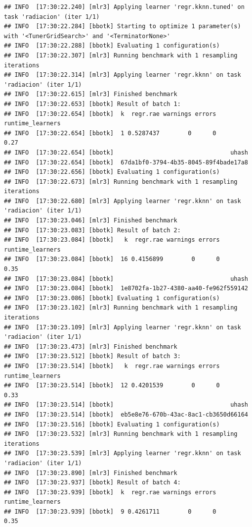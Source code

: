 \documentclass[
  11pt,
  a4paper,
]{article}
\begin{document}
\begin{verbatim}
## INFO  [17:30:22.240] [mlr3] Applying learner 'regr.kknn.tuned' on task 'radiacion' (iter 1/1)
## INFO  [17:30:22.284] [bbotk] Starting to optimize 1 parameter(s) with '<TunerGridSearch>' and '<TerminatorNone>'
## INFO  [17:30:22.288] [bbotk] Evaluating 1 configuration(s)
## INFO  [17:30:22.307] [mlr3] Running benchmark with 1 resampling iterations
## INFO  [17:30:22.314] [mlr3] Applying learner 'regr.kknn' on task 'radiacion' (iter 1/1)
## INFO  [17:30:22.615] [mlr3] Finished benchmark
## INFO  [17:30:22.653] [bbotk] Result of batch 1:
## INFO  [17:30:22.654] [bbotk]  k  regr.rae warnings errors runtime_learners
## INFO  [17:30:22.654] [bbotk]  1 0.5287437        0      0             0.27
## INFO  [17:30:22.654] [bbotk]                                 uhash
## INFO  [17:30:22.654] [bbotk]  67da1bf0-3794-4b35-8045-89f4bade17a8
## INFO  [17:30:22.656] [bbotk] Evaluating 1 configuration(s)
## INFO  [17:30:22.673] [mlr3] Running benchmark with 1 resampling iterations
## INFO  [17:30:22.680] [mlr3] Applying learner 'regr.kknn' on task 'radiacion' (iter 1/1)
## INFO  [17:30:23.046] [mlr3] Finished benchmark
## INFO  [17:30:23.083] [bbotk] Result of batch 2:
## INFO  [17:30:23.084] [bbotk]   k  regr.rae warnings errors runtime_learners
## INFO  [17:30:23.084] [bbotk]  16 0.4156899        0      0             0.35
## INFO  [17:30:23.084] [bbotk]                                 uhash
## INFO  [17:30:23.084] [bbotk]  1e8702fa-1b27-4380-aa40-fe962f559142
## INFO  [17:30:23.086] [bbotk] Evaluating 1 configuration(s)
## INFO  [17:30:23.102] [mlr3] Running benchmark with 1 resampling iterations
## INFO  [17:30:23.109] [mlr3] Applying learner 'regr.kknn' on task 'radiacion' (iter 1/1)
## INFO  [17:30:23.473] [mlr3] Finished benchmark
## INFO  [17:30:23.512] [bbotk] Result of batch 3:
## INFO  [17:30:23.514] [bbotk]   k  regr.rae warnings errors runtime_learners
## INFO  [17:30:23.514] [bbotk]  12 0.4201539        0      0             0.33
## INFO  [17:30:23.514] [bbotk]                                 uhash
## INFO  [17:30:23.514] [bbotk]  eb5e8e76-670b-43ac-8ac1-cb3650d66164
## INFO  [17:30:23.516] [bbotk] Evaluating 1 configuration(s)
## INFO  [17:30:23.532] [mlr3] Running benchmark with 1 resampling iterations
## INFO  [17:30:23.539] [mlr3] Applying learner 'regr.kknn' on task 'radiacion' (iter 1/1)
## INFO  [17:30:23.890] [mlr3] Finished benchmark
## INFO  [17:30:23.937] [bbotk] Result of batch 4:
## INFO  [17:30:23.939] [bbotk]  k  regr.rae warnings errors runtime_learners
## INFO  [17:30:23.939] [bbotk]  9 0.4261711        0      0             0.35

\end{verbatim}
\end{document}
